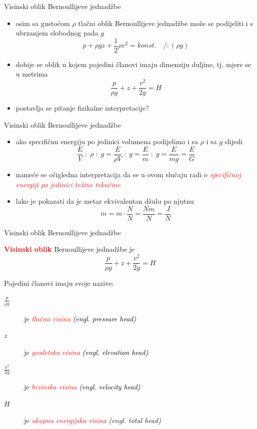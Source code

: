 \documentclass[croatian]{beamer}
\begin{document}
\begin{frame}{Visinski oblik Bernoullijeve jednadžbe}

\begin{itemize}
\item osim sa gustoćom $\rho$ tlačni oblik Bernoullijeve jednadžbe može
se podijeliti i s ubrzanjem slobodnog pada $g$ 
\[
p+\rho gz+\frac{1}{2}\rho v^{2}=konst.\quad/:(\rho g)
\]
\item dobije se oblik u kojem pojedini članovi imaju dimenziju duljine,
tj. mjere se u metrima
\[
\frac{p}{\rho g}+z+\frac{v^{2}}{2g}=H
\]
\item postavlja se pitanje fizikalne interpretacije?
\end{itemize}
\end{frame}

\begin{frame}{Visinski oblik Bernoullijeve jednadžbe}

\begin{itemize}
\item ako specifičnu energiju po jedinici volumena podijelimo i sa $\rho$
i sa $g$ slijedi
\[
\frac{E}{V}\;:\;\rho\;:\;g=\frac{E}{\rho V}\;:\;g=\frac{E}{m}\;:\;g=\frac{E}{mg}=\frac{E}{G}
\]
\item nameće se očigledna interpretacija da se u ovom slučaju radi o \textcolor{red}{\emph{specifičnoj
energiji po jedinici težine tekućine}}
\item lako je pokazati da je metar ekvivalentan džulu po njutnu
\[
m=m\cdot\frac{N}{N}=\frac{Nm}{N}=\frac{J}{N}
\]
\end{itemize}
\end{frame}

\begin{frame}{Visinski oblik Bernoullijeve jednadžbe}

\textbf{\textcolor{red}{Visinski oblik}} Bernoullijeve jednadžbe je
\[
\frac{p}{\rho g}+z+\frac{v^{2}}{2g}=H
\]
\begin{block}{Pojedini članovi imaju svoje nazive:}
\begin{description}
\item [{$\frac{p}{\rho g}$}] je\textcolor{red}{\emph{ tlačna visina }}\textcolor{black}{\emph{(engl.
pressure head)}}
\item [{$z$}] je \textcolor{red}{\emph{geodetska visina }}\textcolor{black}{\emph{(engl.
elevation head)}}
\item [{$\frac{v^{2}}{2g}$}] je \textcolor{red}{\emph{brzinska visina
}}\textcolor{black}{\emph{(engl. velocity head)}}
\item [{$H$}] je \textcolor{red}{\emph{ukupna energijska visina}} \emph{(engl.
total head)}
\end{description}
\end{block}
\end{frame}
\end{document}

